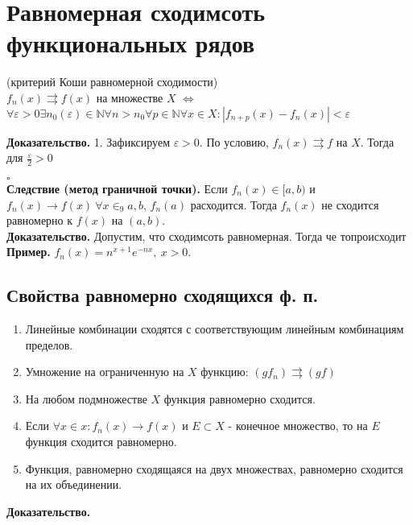 \section{Равномерная сходимсоть функциональных рядов}
\begin{theor}
    (критерий Коши равномерной сходимости)\\
    $f_n(x)\rightrightarrows f(x)$ на множестве  $X$  $\Leftrightarrow$ 
    $\forall \varepsilon>0\exists n_0(\varepsilon)\in\mathbb{N}\forall n>n_0
    \forall p\in\mathbb{N} \forall x\in X: |f_{n+p}(x)-f_n(x)|<\varepsilon$

\end{theor}
\textbf{Доказательство.} 1. Зафиксируем $\varepsilon>0$. По условию,
$f_n(x)\rightrightarrows f$ на $X$. Тогда для  $\frac{\varepsilon}{2}>0$ 



$\square$ \\
\textbf{Следствие (метод граничной точки).} Если $f_n(x)\in[a,b)$ и 
$f_n(x)\to f(x)~\forall x\in_9a,b$, $f_n(a)$ расходится. Тогда  $f_n(x)$
не сходится равномерно к  $f(x)$ на  $(a,b)$.\\
\textbf{Доказательство.} Допустим, что сходимсоть равномерная. Тогда 
че топроисходит\\
\textbf{Пример.} $f_n(x)=n^{x+1}e^{-nx},~x>0$.\\
\subsection{Свойства равномерно сходящихся ф. п.}
\begin{enumerate}
    \item Линейные комбинации сходятся с соответствующим линейным комбинациям
        пределов. 
    \item Умножение на ограниченную на $X$ функцию:  $(gf_n)\rightrightarrows
        (gf)$
    \item На любом подмножестве $X$ функция равномерно сходится. 
    \item Если  $\forall x\in x: f_n(x)\to f(x)$ и $E\subset X$ - конечное 
        множество, то на $E$ функция сходится равномерно.
    \item Функция, равномерно сходящаяся на двух множествах, равномерно
        сходится на их объединении.
\end{enumerate}
\textbf{Доказательство.} 


